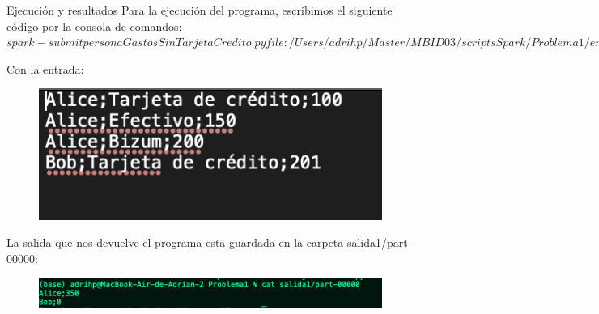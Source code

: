\documentclass[a4paper]{article}
\begin{document}
\clearpage
\begin{section}{Ejecución y resultados}
    Para la ejecución del programa, escribimos el siguiente código por la consola de comandos:
    $spark-submit personaGastosSinTarjetaCredito.py file:/Users/adrihp/Master/MBID03/scriptsSpark/Problema1/entrada1 file:/Users/adrihp/Master/MBID03/scriptsSpark/Problema1/salida1$
    
    \vspace{0.25cm}
    Con la entrada:
    \begin{figure}[h]
        \centering
        \includegraphics[width=\textwidth, keepaspectratio]{Captura de Pantalla 2022-07-08 a las 13.29.01.png}
    \end{figure}

    La salida que nos devuelve el programa esta guardada en la carpeta salida1/part-00000:
    \begin{figure}[h]
        \centering
        \includegraphics[width=\textwidth, keepaspectratio]{codigo6.png}
    \end{figure}
\end{section}
\end{document}
